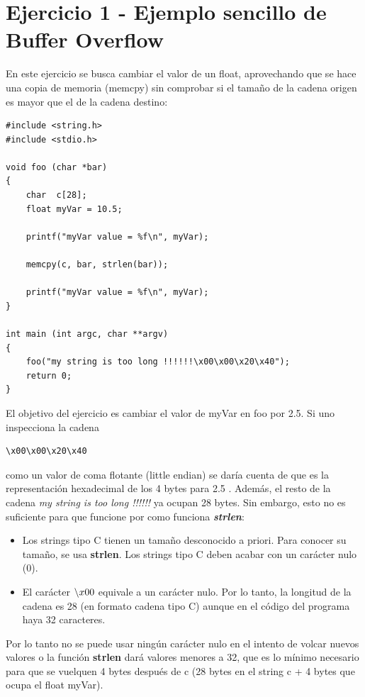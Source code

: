 \documentclass[]{article}
\begin{document}
\newpage
\section{Ejercicio 1 - Ejemplo sencillo de Buffer Overflow}

En este ejercicio se busca cambiar el valor de un float, aprovechando que se hace una copia de memoria (memcpy) sin comprobar si el tamaño de la cadena origen es mayor que el de la cadena destino:

\begin{lstlisting}
#include <string.h>
#include <stdio.h>

void foo (char *bar)
{
	char  c[28];		   
	float myVar = 10.5;  
	
	printf("myVar value = %f\n", myVar);
	
	memcpy(c, bar, strlen(bar)); 
	
	printf("myVar value = %f\n", myVar);
}

int main (int argc, char **argv)
{
	foo("my string is too long !!!!!!\x00\x00\x20\x40");
	return 0;
}
\end{lstlisting}

El objetivo del ejercicio es cambiar el valor de myVar en foo por 2.5. Si uno inspecciona la cadena 

\begin{verbatim}
\x00\x00\x20\x40
\end{verbatim}

\noindent como un valor de coma flotante (little endian) se daría cuenta de que es la representación hexadecimal de los 4 bytes para 2.5  \cite{iee754}. Además, el resto de la cadena \textit{my string is too long !!!!!!} ya ocupan 28 bytes. Sin embargo, esto no es suficiente para que funcione por como funciona \textit{\textbf{strlen}}:

\begin{itemize}
	\item Los strings tipo C tienen un tamaño desconocido a priori. Para conocer su tamaño, se usa \textbf{strlen}. Los strings tipo C deben acabar con un carácter nulo (0). 
	\item El carácter $\symbol{92}x00$ equivale a un carácter nulo. Por lo tanto, la longitud de la cadena es 28 (en formato cadena tipo C) aunque en el código del programa haya 32 caracteres. 
\end{itemize}

Por lo tanto no se puede usar ningún carácter nulo en el intento de volcar nuevos valores o la función \textbf{strlen} dará valores menores a 32, que es lo mínimo necesario para que se vuelquen 4 bytes después de c (28 bytes en el string c + 4 bytes que ocupa el float myVar).
\end{document}
